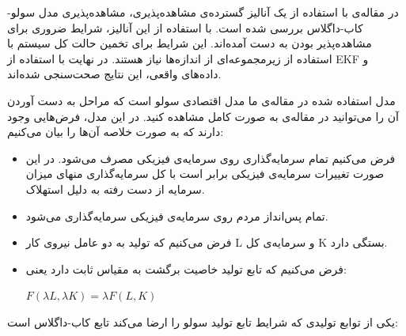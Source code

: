 \documentclass[11pt, fleqn]{article}
\begin{document}
\begin{multicols}{2}
در مقاله‌ی
\cite{main}
با استفاده از  یک آنالیز گسترده‌ی مشاهده‌پذیری، مشاهده‌پذیری مدل سولو-کاب-داگلاس بررسی شده است. با استفاده از این آنالیز، شرایط ضروری برای مشاهده‌پذیر بودن به دست آمده‌اند. این شرایط برای تخمین حالت کل سیستم با استفاده از زیرمجموعه‌ای از اندازه‌ها نیاز هستند. در نهایت با استفاده از EKF و داده‌های واقعی، این نتایج صحت‌سنجی شده‌اند. 


































	مدل استفاده شده در مقاله‌ی ما مدل اقتصادی سولو است که مراحل به دست آوردن آن را می‌توانید در مقاله‌ی
\cite{main}
به صورت کامل مشاهده کنید. در این مدل، فرض‌هایی وجود دارند که به صورت خلاصه آن‌ها را بیان می‌کنیم:

\begin{itemize}
\item
فرض می‌کنیم تمام سرمایه‌گذاری روی سرمایه‌ی فیزیکی مصرف می‌شود. در این صورت تغییرات سرمایه‌‌ی فیزیکی برابر است با کل سرمایه‌گذاری منهای میزان سرمایه از دست رفته به دلیل استهلاک.

\item
تمام پس‌انداز مردم روی سرمایه‌ی فیزیکی سرمایه‌گذاری می‌شود. 

\item
 فرض می‌کنیم که تولید به دو عامل نیروی‌ کار L و سرمایه‌ی کل K بستگی دارد. 

\item
 فرض می‌کنیم که تابع تولید خاصیت برگشت به مقیاس ثابت
	 دارد یعنی:

\begin{latin}
$F(\lambda L, \lambda K) = \lambda F(L, K)$
\end{latin}

\end{itemize}



	یکی از توابع تولیدی که شرایط تابع تولید سولو را ارضا می‌کند تابع کاب-داگلاس است:


\end{multicols}
\end{document}
